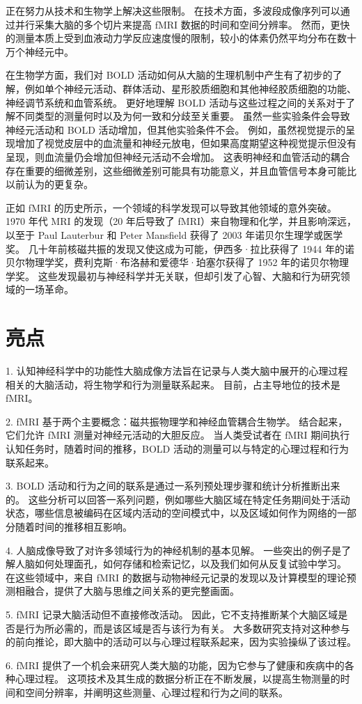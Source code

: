 正在努力从技术和生物学上解决这些限制。 
在技术方面，多波段成像序列可以通过并行采集大脑的多个切片来提高 fMRI 数据的时间和空间分辨率。 
然而，更快的测量本质上受到血液动力学反应速度慢的限制，较小的体素仍然平均分布在数十万个神经元中。


在生物学方面，我们对 BOLD 活动如何从大脑的生理机制中产生有了初步的了解，例如单个神经元活动、群体活动、星形胶质细胞和其他神经胶质细胞的功能、神经调节系统和血管系统。 
更好地理解 BOLD 活动与这些过程之间的关系对于了解不同类型的测量何时以及为何一致和分歧至关重要。 
虽然一些实验条件会导致神经元活动和 BOLD 活动增加，但其他实验条件不会。 
例如，虽然视觉提示的呈现增加了视觉皮层中的血流量和神经元放电，但如果高度期望这种视觉提示但没有呈现，则血流量仍会增加但神经元活动不会增加。 
这表明神经和血管活动的耦合存在重要的细微差别，这些细微差别可能具有功能意义，并且血管信号本身可能比以前认为的更复杂。


正如 fMRI 的历史所示，一个领域的科学发现可以导致其他领域的意外突破。 
1970 年代 MRI 的发现（20 年后导致了 fMRI）来自物理和化学，并且影响深远，以至于 Paul Lauterbur 和 Peter Mansfield 获得了 2003 年诺贝尔生理学或医学奖。
几十年前核磁共振的发现又使这成为可能，伊西多·拉比获得了 1944 年的诺贝尔物理学奖，费利克斯·布洛赫和爱德华·珀塞尔获得了 1952 年的诺贝尔物理学奖。 
这些发现最初与神经科学并无关联，但却引发了心智、大脑和行为研究领域的一场革命。


\section{亮点}

1. 认知神经科学中的功能性大脑成像方法旨在记录与人类大脑中展开的心理过程相关的大脑活动，将生物学和行为测量联系起来。 
目前，占主导地位的技术是 fMRI。 

2. fMRI 基于两个主要概念：磁共振物理学和神经血管耦合生物学。 
结合起来，它们允许 fMRI 测量对神经元活动的大胆反应。 
当人类受试者在 fMRI 期间执行认知任务时，随着时间的推移，BOLD 活动的测量可以与特定的心理过程和行为联系起来。 

3. BOLD 活动和行为之间的联系是通过一系列预处理步骤和统计分析推断出来的。 
这些分析可以回答一系列问题，例如哪些大脑区域在特定任务期间处于活动状态，哪些信息被编码在区域内活动的空间模式中，以及区域如何作为网络的一部分随着时间的推移相互影响。 

4. 人脑成像导致了对许多领域行为的神经机制的基本见解。 
一些突出的例子是了解人脑如何处理面孔，如何存储和检索记忆，以及我们如何从反复试验中学习。 
在这些领域中，来自 fMRI 的数据与动物神经元记录的发现以及计算模型的理论预测相融合，提供了大脑与思维之间关系的更完整画面。 


5. fMRI 记录大脑活动但不直接修改活动。 
因此，它不支持推断某个大脑区域是否是行为所必需的，而是该区域是否与该行为有关。 
大多数研究支持对这种参与的前向推论，即大脑中的活动可以与心理过程联系起来，因为实验操纵了该过程。 


6. fMRI 提供了一个机会来研究人类大脑的功能，因为它参与了健康和疾病中的各种心理过程。 
这项技术及其生成的数据分析正在不断发展，以提高生物测量的时间和空间分辨率，并阐明这些测量、心理过程和行为之间的联系。


%
